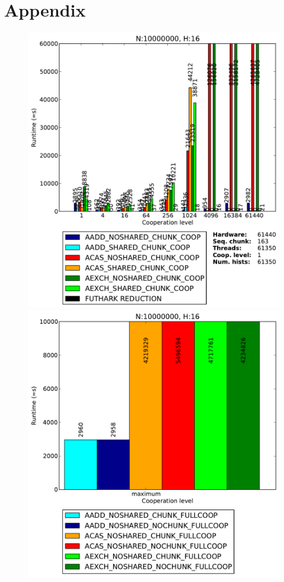 \chapter{Appendix}

%
\begin{figure}
\begin{minipage}{0.5\textwidth}
\includegraphics[scale=0.35]{input/content/figures/experiment/hist-16}
\end{minipage}
\begin{minipage}{0.5\textwidth}
\includegraphics[scale=0.35]{input/content/figures/experiment/hist-16-full}

\end{minipage}
\end{figure}
